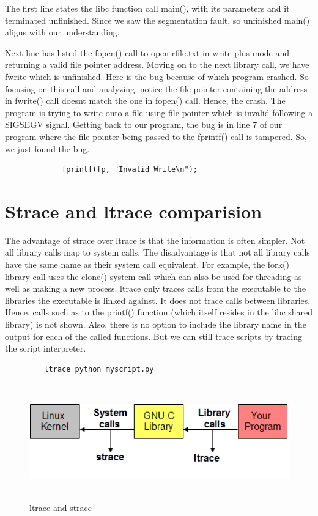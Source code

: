 \documentclass[12pt]{report}
\begin{document}
	The first line states the libc function call main(), with its parameters and it terminated unfinished. Since we saw the segmentation fault, so unfinished main() aligns with our understanding.
	
	Next line has listed the fopen() call to open rfile.txt in write plus mode and returning a valid file pointer address. 
	Moving on to the next library call, we have fwrite which is unfinished. Here is the bug because of which program crashed. So focusing on this call and analyzing, notice the file pointer containing the address in fwrite() call doesnt match the one in fopen() call. Hence, the crash. The program is trying to write onto a file using file pointer which is invalid following a SIGSEGV signal.
	Getting back to our program, the bug is in line 7 of our program where the file pointer being passed to the fprintf() call is tampered. So, we just found the bug.

    \begin{lstlisting}
             fprintf(fp, "Invalid Write\n");
    \end{lstlisting}
    
\section{Strace and ltrace comparision}
The advantage of strace over ltrace is that the information is often simpler. Not all library calls map to system calls. The disadvantage is that not all library calls have the same name as their system call equivalent. For example, the fork() library call uses the clone() system call which can also be used for threading as well as making a new process.
ltrace only traces calls from the executable to the 
libraries the executable is linked against. It does not trace calls between libraries.
Hence, calls such as to the printf() function (which itself resides in the libc shared library) is not shown. Also, there is no option to include the library name in the output for each of the
called functions. But we can still trace scripts by tracing the script interpreter.

\begin{lstlisting}
         ltrace python myscript.py
\end{lstlisting}

\begin{figure}[H]
	\centering
	\includegraphics[width=1.0\textwidth,width=10cm,height=5cm]{lib_sys_calls}
	\caption{ltrace and strace}
\end{figure}
\end{document}
